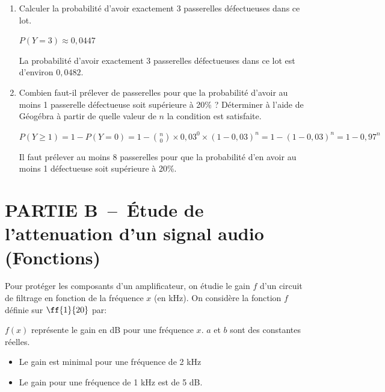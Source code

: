 \begin{enumerate}[resume=monDS]
\begin{blocvisiblex}[height=1.5]
        \smallskip
    La probabilité d'avoir au moins 2 passerelles défectueuses dans ce lot est d'environ $0,2269$.
    \end{blocvisiblex}
    \medskip

    \pagebreak

    \item Calculer la probabilité d'avoir exactement 3 passerelles défectueuses dans ce lot.
    \begin{blocvisiblex}[height=1.5]
    {\quad}
    $P(Y=3)\approx 0,0447$

        \smallskip  
    La probabilité d'avoir exactement 3 passerelles défectueuses dans ce lot est d'environ $0,0482$.
    \end{blocvisiblex}
    \medskip
    \item Combien faut-il prélever de passerelles pour que la probabilité d'avoir au moins 1 passerelle défectueuse soit supérieure à 20\% ? Déterminer à l'aide de Géogébra à partir de quelle valeur de $n$ la condition est satisfaite.
    \begin{blocvisiblex}[height=2]
    {\quad}
    $P(Y\geq 1)=1-P(Y=0)=1-\binom{n}{0} \times 0,03^0 \times (1-0,03)^n = 1-(1-0,03)^n=1-0,97^n$  

    Il faut prélever au moins 8 passerelles pour que la probabilité d'en avoir au moins 1 défectueuse soit supérieure à 20\%.
    \end{blocvisiblex}
     \end{enumerate}


\section*{PARTIE B~--~Étude de l'attenuation d'un signal audio (Fonctions)}

Pour protéger les composants d'un amplificateur, on étudie le gain $f$ d'un circuit de filtrage en fonction de la fréquence $x$ (en kHz).
On considère la fonction $f$ définie sur $\ff{1}{20}$ par:

 \quad $f(x)$ représente le gain en dB pour une fréquence $x$. $a$ et $b$ sont des constantes réelles.

\begin{itemize}
    \item Le gain est minimal pour une fréquence de 2 kHz
    \item Le gain pour une fréquence de 1 kHz est de 5 dB.
\end{itemize}

